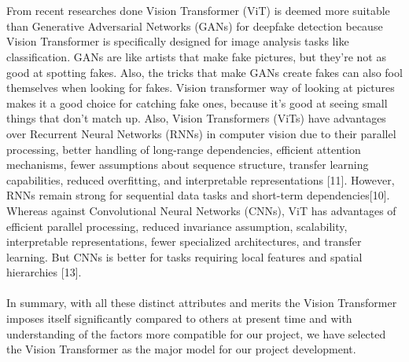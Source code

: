 \\\\
From recent researches done Vision Transformer (ViT) is deemed more suitable than Generative Adversarial Networks (GANs) for deepfake detection because Vision Transformer is specifically designed for image analysis tasks like classification. GANs are like artists that make fake pictures, but they're not as good at spotting fakes. Also, the tricks that make GANs create fakes can also fool themselves when looking for fakes. Vision transformer way of looking at pictures makes it a good choice for catching fake ones, because it's good at seeing small things that don't match up. Also, Vision Transformers (ViTs) have advantages over Recurrent Neural Networks (RNNs) in computer vision due to their parallel processing, better handling of long-range dependencies, efficient attention mechanisms, fewer assumptions about sequence structure, transfer learning capabilities, reduced overfitting, and interpretable representations [11]. However, RNNs remain strong for sequential data tasks and short-term dependencies[10]. Whereas against Convolutional Neural Networks (CNNs), ViT has advantages of efficient parallel processing, reduced invariance assumption, scalability, interpretable representations, fewer specialized architectures, and transfer learning. But CNNs is better for tasks requiring local features and spatial hierarchies [13].
\\\\
In summary, with all these distinct attributes and merits the Vision Transformer imposes itself significantly compared to others at present time and with understanding of the factors more compatible for our project, we have selected the Vision Transformer as the major model for our project development.

